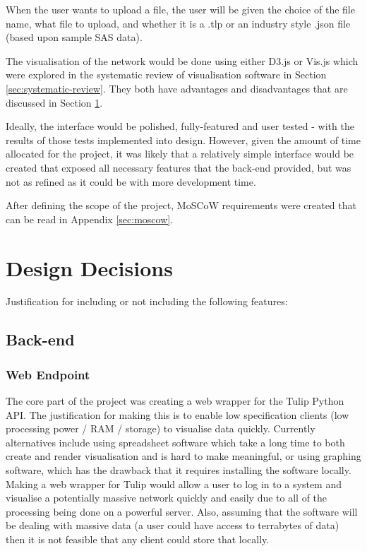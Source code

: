 \documentclass[../dissertation.tex]{subfiles}
\begin{document}
When the user wants to upload a file, the user will be given the choice of the file name, what file to upload, and whether it is a .tlp or an industry style .json file (based upon sample SAS data).

The visualisation of the network would be done using either D3.js or Vis.js which were explored in the systematic review of visualisation software in Section \ref{sec:systematic-review}. They both have advantages and disadvantages that are discussed in Section \ref{sec:designdec}. 

Ideally, the interface would be polished, fully-featured and user tested - with the results of those tests implemented into design. However, given the amount of time allocated for the project, it was likely that a relatively simple interface would be created that exposed all necessary features that the back-end provided, but was not as refined as it could be with more development time.

After defining the scope of the project, MoSCoW requirements were created that can be read in Appendix \ref{sec:moscow}.

\section{Design Decisions}
\label{sec:designdec}

Justification for including or not including the following features:

\subsection{Back-end}

\subsubsection{Web Endpoint}

The core part of the project was creating a web wrapper for the Tulip Python API. The justification for making this is to enable low specification clients (low processing power / RAM / storage) to visualise data quickly. Currently alternatives include using spreadsheet software which take a long time to both create and render visualisation and is hard to make meaningful, or using graphing software, which has the drawback that it requires installing the software locally. Making a web wrapper for Tulip would allow a user to log in to a system and visualise a potentially massive network quickly and easily due to all of the processing being done on a powerful server. Also, assuming that the software will be dealing with massive data (a user could have access to terrabytes of data) then it is not feasible that any client could store that locally.
\end{document}
